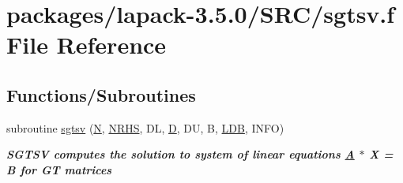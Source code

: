 \hypertarget{sgtsv_8f}{}\section{packages/lapack-\/3.5.0/\+S\+R\+C/sgtsv.f File Reference}
\label{sgtsv_8f}
\subsection*{Functions/\+Subroutines}
\begin{DoxyCompactItemize}
\item 
subroutine \hyperlink{group__realGTsolve_gae1cbb7cd9c376c9cc72575d472eba346}{sgtsv} (\hyperlink{polmisc_8c_a0240ac851181b84ac374872dc5434ee4}{N}, \hyperlink{example__user_8c_aa0138da002ce2a90360df2f521eb3198}{N\+R\+H\+S}, D\+L, \hyperlink{odrpack_8h_a7dae6ea403d00f3687f24a874e67d139}{D}, D\+U, B, \hyperlink{example__user_8c_a50e90a7104df172b5a89a06c47fcca04}{L\+D\+B}, I\+N\+F\+O)
\begin{DoxyCompactList}\small\item\em {\bfseries  S\+G\+T\+S\+V computes the solution to system of linear equations \hyperlink{classA}{A} $\ast$ X = B for G\+T matrices {\bfseries  }}\end{DoxyCompactList}\end{DoxyCompactItemize}
